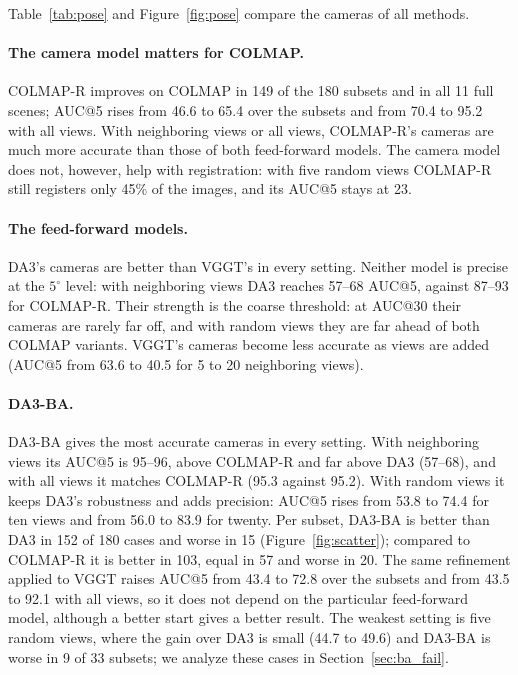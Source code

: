 \documentclass[10pt,twocolumn,letterpaper]{article}
\begin{document}
Table~\ref{tab:pose} and Figure~\ref{fig:pose} compare the cameras of all methods.

\paragraph{The camera model matters for COLMAP.}
COLMAP-R improves on COLMAP in 149 of the 180 subsets and in all 11 full scenes; AUC@5 rises from 46.6 to 65.4
over the subsets and from 70.4 to 95.2 with all views. With neighboring views or all views, COLMAP-R's cameras
are much more accurate than those of both feed-forward models. The camera model does not, however, help with
registration: with five random views COLMAP-R still registers only 45\% of the images, and its AUC@5 stays at
23.

\paragraph{The feed-forward models.}
DA3's cameras are better than VGGT's in every setting. Neither model is precise at the $5^\circ$ level: with
neighboring views DA3 reaches 57--68 AUC@5, against 87--93 for COLMAP-R. Their strength is the coarse
threshold: at AUC@30 their cameras are rarely far off, and with random views they are far ahead of both COLMAP
variants.
VGGT's cameras become less accurate as views are added (AUC@5 from 63.6 to 40.5 for 5 to 20 neighboring views).

\paragraph{DA3-BA.}
DA3-BA gives the most accurate cameras in every setting. With neighboring views its AUC@5 is 95--96, above
COLMAP-R and far above DA3 (57--68), and with all views it matches COLMAP-R (95.3 against 95.2). With random
views it keeps DA3's robustness and adds precision: AUC@5 rises from 53.8 to 74.4 for ten views and from 56.0 to
83.9 for twenty. Per subset, DA3-BA is better than DA3 in 152 of 180 cases and worse in 15
(Figure~\ref{fig:scatter}); compared to COLMAP-R it is better in 103, equal in 57 and worse in 20. The same
refinement applied to VGGT raises AUC@5 from 43.4 to 72.8 over the subsets and from 43.5 to 92.1 with all views,
so it does not depend on the particular feed-forward model, although a better start gives a better result.
The weakest setting is five random views, where the gain over DA3 is small (44.7 to 49.6) and DA3-BA is worse
in 9 of 33 subsets; we analyze these cases in Section~\ref{sec:ba_fail}.
\end{document}
